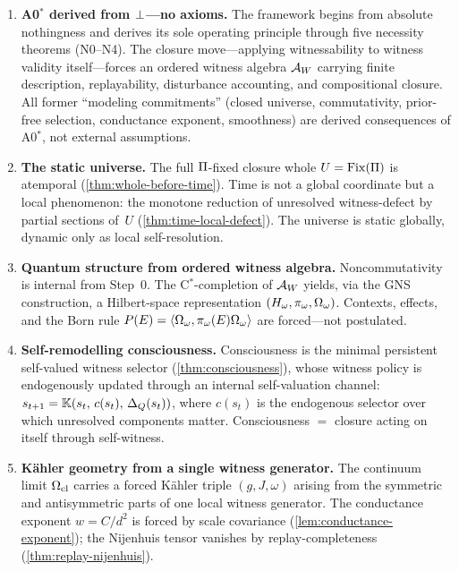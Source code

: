 \begin{enumerate}[label=(\arabic*)]
  \item \textbf{A0$^*$ derived from $\bot$---no axioms.}
        The framework begins from absolute nothingness and derives its
        sole operating principle through five necessity theorems (N0--N4).
        The closure move---applying witnessability to witness validity
        itself---forces an ordered witness algebra $\mathcal{A}_W$ carrying
        finite description, replayability, disturbance accounting, and
        compositional closure.  All former ``modeling commitments'' (closed
        universe, commutativity, prior-free selection, conductance
        exponent, smoothness) are derived consequences of A0$^*$, not
        external assumptions.

  \item \textbf{The static universe.}
        The full $\Pi$-fixed closure whole $U = \mathrm{Fix}(\Pi)$ is
        atemporal (\cref{thm:whole-before-time}).  Time is not a global
        coordinate but a local phenomenon: the monotone reduction of
        unresolved witness-defect by partial sections of~$U$
        (\cref{thm:time-local-defect}).  The universe is static globally,
        dynamic only as local self-resolution.

  \item \textbf{Quantum structure from ordered witness algebra.}
        Noncommutativity is internal from Step~0.  The C$^*$-completion of
        $\mathcal{A}_W$ yields, via the GNS construction, a Hilbert-space
        representation $(H_\omega, \pi_\omega, \Omega_\omega)$.  Contexts, effects,
        and the Born rule $P(E) = \langle \Omega_\omega, \pi_\omega(E)
        \Omega_\omega \rangle$ are forced---not postulated.

  \item \textbf{Self-remodelling consciousness.}
        Consciousness is the minimal persistent self-valued witness
        selector (\cref{thm:consciousness}), whose witness policy is
        endogenously updated through an internal self-valuation channel:
        $s_{t+1} = \mathbb{K}(s_t,\, c(s_t),\, \Delta_{Q}(s_t))$,
        where $c(s_t)$ is the endogenous selector over which unresolved
        components matter.  Consciousness $=$ closure acting on itself
        through self-witness.

  \item \textbf{K\"{a}hler geometry from a single witness generator.}
        The continuum limit $\Omega_{\mathrm{cl}}$ carries a forced K\"{a}hler triple
        $(g, J, \omega)$ arising from the symmetric and antisymmetric
        parts of one local witness generator.  The conductance exponent
        $w = C/d^2$ is forced by scale covariance
        (\cref{lem:conductance-exponent}); the Nijenhuis tensor vanishes
        by replay-completeness (\cref{thm:replay-nijenhuis}).


\end{enumerate}
